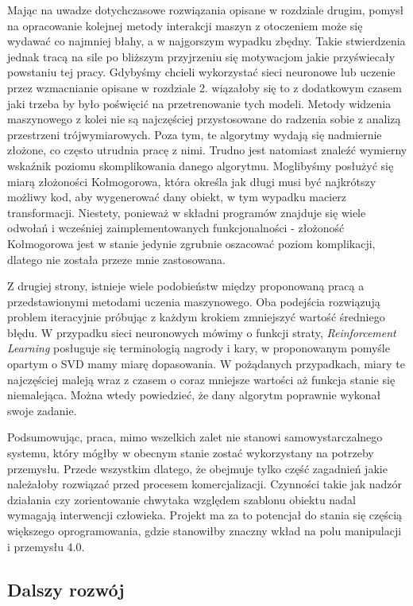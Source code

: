 \documentclass{article}
\begin{document}
Mając na uwadze dotychczasowe rozwiązania opisane w rozdziale drugim, pomysł na opracowanie kolejnej metody interakcji maszyn z otoczeniem może się wydawać co najmniej błahy, a w najgorszym wypadku zbędny. Takie stwierdzenia jednak tracą na sile po bliższym przyjrzeniu się motywacjom jakie przyświecały powstaniu tej pracy. Gdybyśmy chcieli wykorzystać sieci neuronowe lub uczenie przez wzmacnianie opisane w rozdziale 2. wiązałoby się to z dodatkowym czasem jaki trzeba by było poświęcić na przetrenowanie tych modeli. Metody widzenia maszynowego z kolei nie są najczęściej przystosowane do radzenia sobie z analizą przestrzeni trójwymiarowych. Poza tym, te algorytmy wydają się nadmiernie złożone, co często utrudnia pracę z nimi. Trudno jest natomiast znaleźć wymierny wskaźnik poziomu skomplikowania danego algorytmu. Moglibyśmy posłużyć się miarą złożoności Kołmogorowa, która określa jak długi musi być najkrótszy możliwy kod, aby wygenerować dany obiekt, w tym wypadku macierz transformacji.  Niestety, ponieważ w składni programów znajduje się wiele odwołań i wcześniej zaimplementowanych funkcjonalności - złożoność Kołmogorowa jest w stanie jedynie zgrubnie oszacować poziom komplikacji, dlatego nie została przeze mnie zastosowana.

Z drugiej strony, istnieje wiele podobieństw między proponowaną pracą a przedstawionymi metodami uczenia maszynowego. Oba podejścia rozwiązują problem iteracyjnie próbując z każdym krokiem zmniejszyć wartość średniego błędu. W przypadku sieci neuronowych mówimy o funkcji straty, \emph{Reinforcement Learning} posługuje się terminologią nagrody i kary, w proponowanym pomyśle opartym o SVD mamy miarę dopasowania. W pożądanych przypadkach, miary te najczęściej maleją wraz z czasem o coraz mniejsze wartości aż funkcja stanie się niemalejąca. Można wtedy powiedzieć, że dany algorytm poprawnie wykonał swoje zadanie.

Podsumowując, praca, mimo wszelkich zalet nie stanowi samowystarczalnego systemu, który mógłby w obecnym stanie zostać wykorzystany na potrzeby przemysłu. Przede wszystkim dlatego, że obejmuje tylko część zagadnień jakie należałoby rozwiązać przed procesem komercjalizacji. Czynności takie jak nadzór działania czy zorientowanie chwytaka względem szablonu obiektu nadal wymagają interwencji człowieka. Projekt ma za to potencjał do stania się częścią większego oprogramowania, gdzie stanowiłby znaczny wkład na polu manipulacji i przemysłu 4.0.

\subsection*{\LARGE{Dalszy rozwój}} 
\end{document}
